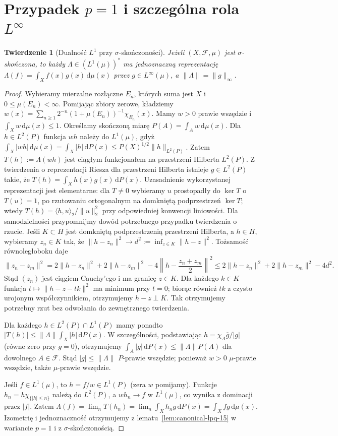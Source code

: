 \documentclass[11pt,a4paper,oneside]{book}
\numberwithin{equation}{chapter}
\theoremstyle{plain}
\newtheorem{twierdzenie}{Twierdzenie}[chapter]
\theoremstyle{definition}
\theoremstyle{remark}
\begin{document}
\section{Przypadek $p=1$ i szczególna rola $L^\infty$}
\begin{twierdzenie}[Dualność $L^1$ przy $\sigma$-skończoności]
\label{thm:dual-l1-15}
Jeżeli $(X,\mathcal F,\mu)$ jest $\sigma$-skończona, to
każdy $\Lambda\in(L^1(\mu))^*$ ma jednoznaczną reprezentację
$\Lambda(f)=\int_X f(x)g(x)\,\mathrm d\mu(x)$
przez $g\in L^\infty(\mu)$, a $\|\Lambda\|=\|g\|_\infty$.
\end{twierdzenie}
\begin{proof}
Wybieramy mierzalne rozłączne $E_n$, których suma jest $X$
i $0\le\mu(E_n)<\infty$. Pomijając zbiory zerowe, kładziemy
$w(x)=\sum_{n\ge1}2^{-n}(1+\mu(E_n))^{-1}\chi_{E_n}(x)$.
Mamy $w>0$ prawie wszędzie i $\int_Xw\,\mathrm d\mu(x)\le1$.
Określamy skończoną miarę $P(A)=\int_Aw\,\mathrm d\mu(x)$.
Dla $h\in L^2(P)$ funkcja $wh$ należy do $L^1(\mu)$, gdyż
$\int_X|wh|\,\mathrm d\mu(x)=\int_X|h|\,\mathrm dP(x)
\le P(X)^{1/2}\|h\|_{L^2(P)}$. Zatem
$T(h):=\Lambda(wh)$ jest ciągłym funkcjonałem na
przestrzeni Hilberta $L^2(P)$. Z twierdzenia o reprezentacji
Riesza dla przestrzeni Hilberta istnieje $g\in L^2(P)$
takie, że $T(h)=\int_X h(x)g(x)\,\mathrm dP(x)$.
Uzasadnienie wykorzystanej reprezentacji jest elementarne:
dla $T\ne0$ wybieramy $u$ prostopadły do $\ker T$ o
$T(u)=1$, po rzutowaniu ortogonalnym na domkniętą
podprzestrzeń $\ker T$; wtedy
$T(h)=\langle h,u\rangle_2/\|u\|_2^2$ przy odpowiedniej
konwencji liniowości. Dla samodzielności przypomnijmy dowód potrzebnego
przypadku twierdzenia o rzucie. Jeśli $K\subset H$ jest
domkniętą podprzestrzenią przestrzeni Hilberta,
a $h\in H$, wybieramy $z_n\in K$ tak, że
$\|h-z_n\|^2\to d^2:=\inf_{z\in K}\|h-z\|^2$.
Tożsamość równoległoboku daje
\[
\|z_n-z_m\|^2
=2\|h-z_n\|^2+2\|h-z_m\|^2
-4\left\|h-\frac{z_n+z_m}{2}\right\|^2
\le2\|h-z_n\|^2+2\|h-z_m\|^2-4d^2.
\]
Stąd $(z_n)$ jest ciągiem Cauchy'ego i ma granicę
$z\in K$. Dla każdego $k\in K$ funkcja
$t\mapsto\|h-z-tk\|^2$ ma minimum przy $t=0$;
biorąc również $tk$ z czysto urojonym współczynnikiem,
otrzymujemy $h-z\perp K$. Tak otrzymujemy potrzebny rzut
bez odwołania do zewnętrznego twierdzenia.

Dla każdego $h\in L^2(P)\cap L^1(P)$ mamy ponadto
$|T(h)|\le\|\Lambda\|\int_X|h|\,\mathrm dP(x)$.
W szczególności, podstawiając
$h=\chi_A\overline g/|g|$ (równe zero przy $g=0$),
otrzymujemy
$\int_A|g|\,\mathrm dP(x)\le\|\Lambda\|P(A)$
dla dowolnego $A\in\mathcal F$. Stąd
$|g|\le\|\Lambda\|$ $P$-prawie wszędzie; ponieważ
$w>0$ $\mu$-prawie wszędzie, także $\mu$-prawie wszędzie.

Jeśli $f\in L^1(\mu)$, to $h=f/w\in L^1(P)$
(zera $w$ pomijamy). Funkcje
$h_n=h\chi_{\{|h|\le n\}}$ należą do
$L^2(P)$, a $wh_n\to f$ w $L^1(\mu)$, co wynika
z dominacji przez $|f|$. Zatem
$\Lambda(f)=\lim_nT(h_n)=\lim_n\int_Xh_ng\,\mathrm dP(x)
=\int_Xfg\,\mathrm d\mu(x)$.
Izometrię i jednoznaczność otrzymujemy z
lematu~\ref{lem:canonical-lpq-15} w wariancie $p=1$
i z $\sigma$-skończonością.
\end{proof}
\end{document}
